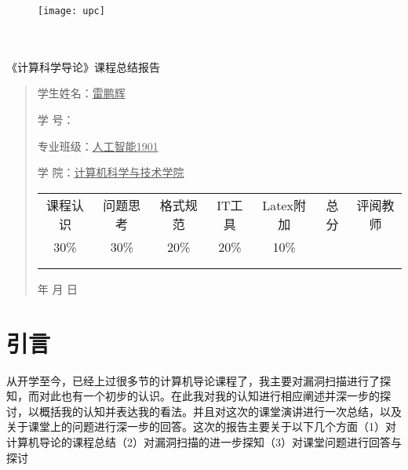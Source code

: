 \documentclass{article}
\renewcommand{\today}{\number\year 年 \number\month 月 \number\day 日}
\begin{document}
	
	\begin{figure}
		\centering
		\texttt{[image: upc]}
		
		\label{figupc}
	\end{figure}
	
	\begin{center}
		\quad \\
		\quad \\
		\heiti \fontsize{45}{17} \quad \quad \quad 
		\vskip 1.5cm
		\heiti {} 《计算科学导论》课程总结报告
	\end{center}
	\vskip 2.0cm
	
	\begin{quotation}
		\doublespacing
		
		\par\setlength\parindent{7em}
		\quad 
		
		学生姓名：\underline{\qquad  雷鹏辉\qquad \qquad}
		
		学\hspace{0.61cm} 号：\underline{\qquad}
		
		专业班级：\underline{\qquad 人工智能1901 \qquad  }
		
		学\hspace{0.61cm} 院：\underline{计算机科学与技术学院}
		\vskip 2cm
		\centering
		\begin{table}[h]
			\centering 
			\begin{tabular}{|c|c|c|c|c|c|c|}
				\hline
				课程认识 & 问题思 考 & 格式规范  & IT工具  & Latex附加  & 总分 & 评阅教师 \\
				30\% & 30\% & 20\% & 20\% & 10\% &  &  \\
				\hline
				& & & & & &\\
				& & & & & &\\
				\hline
			\end{tabular}
		\end{table}
		\vskip 2cm
		\today
	\end{quotation}
	
	\thispagestyle{empty}
	\newpage
	\setcounter{page}{1}
\section{引言}
\large{}从开学至今，已经上过很多节的计算机导论课程了，我主要对漏洞扫描进行了探知，而对此也有一个初步的认识。在此我对我的认知进行相应阐述并深一步的探讨，以概括我的认知并表达我的看法。并且对这次的课堂演讲进行一次总结，以及关于课堂上的问题进行深一步的回答。这次的报告主要关于以下几个方面（1）对计算机导论的课程总结（2）对漏洞扫描的进一步探知（3）对课堂问题进行回答与探讨
\end{document}

